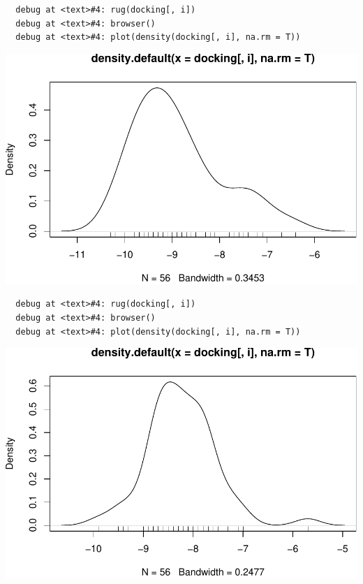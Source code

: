 \documentclass[12pt,twoside]{reedthesis}
\begin{document}
  \begin{verbatim}
  debug at <text>#4: rug(docking[, i])
  debug at <text>#4: browser()
  debug at <text>#4: plot(density(docking[, i], na.rm = T))
  \end{verbatim}
  
  \begin{center}\includegraphics{tesis_files/figure-latex/johan-10} \end{center}
  
  \begin{verbatim}
  debug at <text>#4: rug(docking[, i])
  debug at <text>#4: browser()
  debug at <text>#4: plot(density(docking[, i], na.rm = T))
  \end{verbatim}
  
  \begin{center}\includegraphics{tesis_files/figure-latex/johan-11} \end{center}
  
\end{document}
